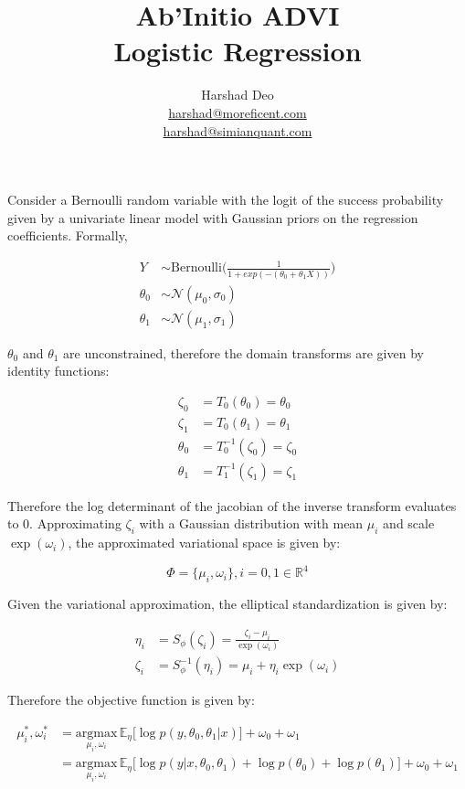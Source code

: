 \documentclass[10pt]{article}
\title{Ab'Initio ADVI \\ Logistic Regression}
\author{Harshad Deo \\ 
  \href{mailto:harshad@moreficent.com}{harshad@moreficent.com} \\ 
  \href{mailto:harshad@simianquant.com}{harshad@simianquant.com}
}
\date{}
\begin{document}
  
\maketitle

Consider a Bernoulli random variable with the logit of the success probability given by a univariate linear model with 
Gaussian priors on the regression coefficients. Formally,

\begin{align*}
  Y &\sim \text{Bernoulli}\Big(\frac{1}{1 + exp(-(\theta_0 + \theta_1 X))}\Big) \\
  \theta_0 &\sim \mathcal{N}(\mu_0, \sigma_0) \\
  \theta_1 &\sim \mathcal{N}(\mu_1, \sigma_1)
\end{align*}

$\theta_0$ and $\theta_1$ are unconstrained, therefore the domain transforms are given by identity functions:

\begin{align*}
  \zeta_0 &= T_0(\theta_0) = \theta_0 \\
  \zeta_1 &= T_0(\theta_1) = \theta_1 \\
  \theta_0 &= T^{-1}_0(\zeta_0) = \zeta_0 \\
  \theta_1 &= T^{-1}_1(\zeta_1) = \zeta_1
\end{align*}

Therefore the log determinant of the jacobian of the inverse transform evaluates to 0. Approximating $\zeta_i$ with a 
Gaussian distribution with mean $\mu_i$ and scale $\exp(\omega_i)$, the approximated variational space is given by:

\begin{equation*}
  \Phi = \{\mu_i, \omega_i\}, i = 0, 1 \in \mathbb{R}^4
\end{equation*}


Given the variational approximation, the elliptical standardization is given by:

\begin{align*}
  \eta_i &= S_{\phi}(\zeta_i) = \frac{\zeta_i - \mu_i}{\exp(\omega_i)} \\
  \zeta_i &= S_{\phi}^{-1}(\eta_i) = \mu_i + \eta_i \exp(\omega_i)
\end{align*}


Therefore the objective function is given by:

\begin{align*}
  \mu_i^*, \omega_i^* &= \underset{\mu_i, \omega_i}{\text{argmax}}\,\mathbb{E}_\eta\big[\log p(y, \theta_0, \theta_1|x) \big] + \omega_0 + \omega_1 \\
  &= \underset{\mu_i, \omega_i}{\text{argmax}}\,\mathbb{E}_\eta\big[\log p(y |x, \theta_0, \theta_1) + \log p(\theta_0) + \log p (\theta_1) \big] + \omega_0 + \omega_1
\end{align*}
\end{document}
